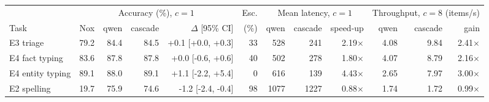 \begin{tabular}{lrrrrrrrrrrr}
\toprule
 & \multicolumn{4}{c}{Accuracy (\%), $c=1$} & Esc. & \multicolumn{3}{c}{Mean latency, $c=1$} & \multicolumn{3}{c}{Throughput, $c=8$ (items/s)} \\
\cmidrule(lr){2-5}\cmidrule(lr){7-9}\cmidrule(lr){10-12}
Task & Nox & qwen & cascade & $\Delta$ [95\% CI] & (\%) & qwen & cascade & speed-up & qwen & cascade & gain \\
\midrule
E3 triage & 79.2 & 84.4 & 84.5 & +0.1 [+0.0, +0.3] & 33 & 528 & 241 & 2.19$\times$ & 4.08 & 9.84 & 2.41$\times$ \\
E4 fact typing & 83.6 & 87.8 & 87.8 & +0.0 [-0.6, +0.6] & 40 & 502 & 278 & 1.80$\times$ & 4.07 & 8.79 & 2.16$\times$ \\
E4 entity typing & 89.1 & 88.0 & 89.1 & +1.1 [-2.2, +5.4] & 0 & 616 & 139 & 4.43$\times$ & 2.65 & 7.97 & 3.00$\times$ \\
E2 spelling & 19.7 & 75.9 & 74.6 & -1.2 [-2.4, -0.4] & 98 & 1077 & 1227 & 0.88$\times$ & 1.74 & 1.72 & 0.99$\times$ \\
\bottomrule
\end{tabular}
